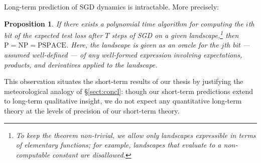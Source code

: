 \documentclass[openany, notitlepage, justified]{tufte-book}
\theoremstyle{plain}
\newtheorem{prop}{Proposition}
\theoremstyle{definition}
\begin{document}
        Long-term prediction of SGD dynamics is intractable.  More precisely:
        \begin{prop} \label{prop:pspace}
            If there exists a polynomial time algorithm for computing the $i$th
            bit of the expected test loss after $T$ steps of SGD on a given
            landscape,\footnote{
                To keep the theorem non-trivial, we allow only landscapes
                expressible in terms of elementary functions; for example,
                landscapes that evaluate to a non-computable constant are
                disallowed.
            } then $\text{P}=\text{NP}=\text{PSPACE}$.  Here, the landscape is
            given as an oracle for the $j$th bit 
            --- assumed well-defined --- of any well-formed expression
            involving expectations, products, and derivatives applied to the
            landscape.
        \end{prop}
        This observation situates the short-term results of our thesis by
        justifying the meteorological analogy of \S\ref{sect:concl}: though our
        short-term predictions extend to long-term qualitative insight, we do
        not expect any quantitative long-term theory at the levels of
        precision of our short-term theory.
\end{document}
